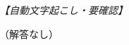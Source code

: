 \documentclass[../../main.tex]{subfiles}
\begin{document}
\begin{oframed}
  
\end{oframed}

\begin{flushright}
  \footnotesize\textit{【自動文字起こし・要確認】}
\end{flushright}

（解答なし）
\end{document}

